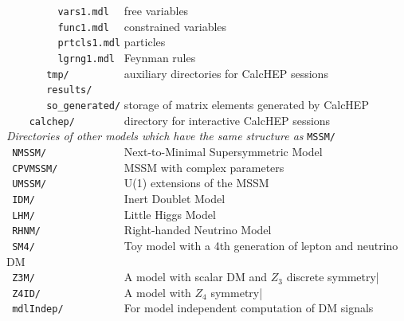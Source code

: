 \documentclass[12pt,a4paper]{article}
\begin{document}
\verb|         vars1.mdl  |  free  variables   \\
\verb|         func1.mdl  |  constrained variables   \\
\verb|         prtcls1.mdl|  particles  \\
\verb|         lgrng1.mdl |   Feynman rules\\
\verb|       tmp/         | auxiliary directories for CalcHEP sessions    \\
\verb|       results/  |                                                  \\
\verb|       so_generated/|   storage  of  matrix elements generated by CalcHEP \\
\verb|    calchep/        |   directory for interactive CalcHEP sessions    \\
{\it Directories of other models which have the same structure as} {\tt  MSSM/ }\\
\verb| NMSSM/             |         Next-to-Minimal Supersymmetric Model\cite{Ellwanger:2006rn,Belanger:2005kh} \\
\verb| CPVMSSM/           |         MSSM with complex parameters\cite{Lee:2003nta,  Belanger:2006qa} \\
\verb| UMSSM/             |         U(1) extensions of the MSSM\cite{DaSilva:2013jga,Belanger:2015cra} \\
\verb| IDM/               |         Inert Doublet Model\cite{Barbieri:2006dq}  \\
\verb| LHM/               |         Little Higgs Model\cite{Belyaev:2006jh} \\
\verb| RHNM/              |         Right-handed Neutrino Model\cite{Belanger:2007dx}                  \\
\verb| SM4/               |            Toy model with a 4th generation of lepton and neutrino DM   \\
\verb| Z3M/               |           A model with scalar DM and $Z_3$ discrete
symmetry|\cite{Belanger:2012vp,Belanger:2014bga} \\
\verb| Z4ID/              |           A model with $Z_4$
symmetry|\cite{Belanger:2012vp,Belanger:2014bga} \\  
\verb| mdlIndep/          |           For model independent computation of DM signals                                 \\
\end{document}

